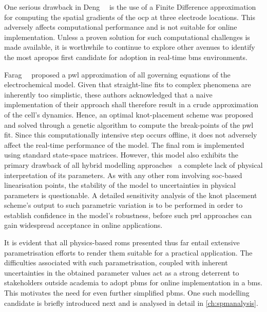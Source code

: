 One  serious drawback  in Deng~\etal{}~\cite{Deng2018}  is the  use of  a Finite
Difference approximation for computing the spatial gradients of the \gls{ocp} at
three electrode locations. This  adversely affects computational performance and
is not  suitable for online  implementation. Unless  a proven solution  for such
computational  challenges is  made available,  it is  worthwhile to  continue to
explore other avenues to identify the  most apropos first candidate for adoption
in real-time \gls{bms} environments.

Farag~\etal{}~\cite{Farag2017}  proposed   a  \gls{pwl}  approximation   of  all
governing equations of the electrochemical  model. Given that straight-line fits
to complex phenomena  are inherently too simplistic,  these authors acknowledged
that a naive implementation of their  approach shall therefore result in a crude
approximation of  the cell's dynamics.  Hence, an optimal  knot-placement scheme
was proposed and solved through a  genetic algorithm to compute the break-points
of the \gls{pwl} fit. Since  this computationally intensive step occurs offline,
it does not  adversely affect the real-time performance of  the model. The final
\gls{rom}  is implemented  using  standard state-space  matrices. However,  this
model  also exhibits  the primary  drawback of  all hybrid  modelling approaches
\ie~a complete lack of physical  interpretation of its parameters. As with any
other \gls{rom} involving \gls{soc}-based linearisation points, the stability of
the model  to uncertainties in  physical parameters is questionable.  A detailed
sensitivity analysis  of the knot  placement scheme's output to  such parametric
variation is  to be performed  in order to  establish confidence in  the model's
robustness, before such  \gls{pwl} approaches can gain  widespread acceptance in
online applications.


It  is evident  that all  physics-based  \glspl{rom} presented  thus far  entail
extensive  parametrisation  efforts to  render  them  suitable for  a  practical
application. The difficulties associated with such parametrisation, coupled with
inherent  uncertainties  in  the  obtained  parameter values  act  as  a  strong
deterrent  to stakeholders  outside  academia to  adopt  \glspl{pbm} for  online
implementation  in  a  \gls{bms}.  This  motivates the  need  for  even  further
simplified \glspl{pbm}. One such modelling  candidate is briefly introduced next
and is analysed in detail in \cref{ch:spmanalysis}.



